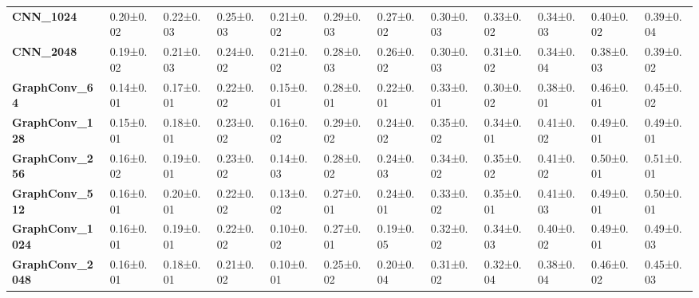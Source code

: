 \begin{tabular}{llllllllllll}
\textbf{CNN\_1024      } &   0.20±0.02 &  0.22±0.03 &  0.25±0.03 &  0.21±0.02 &  0.29±0.03 &  0.27±0.02 &  0.30±0.03 &  0.33±0.02 &  0.34±0.03 &   0.40±0.02 &   0.39±0.04 \\
\textbf{CNN\_2048      } &   0.19±0.02 &  0.21±0.03 &  0.24±0.02 &  0.21±0.02 &  0.28±0.03 &  0.26±0.02 &  0.30±0.03 &  0.31±0.02 &  0.34±0.04 &   0.38±0.03 &   0.39±0.02 \\
\textbf{GraphConv\_64  } &   0.14±0.01 &  0.17±0.01 &  0.22±0.02 &  0.15±0.01 &  0.28±0.01 &  0.22±0.01 &  0.33±0.01 &  0.30±0.02 &  0.38±0.01 &   0.46±0.01 &   0.45±0.02 \\
\textbf{GraphConv\_128 } &   0.15±0.01 &  0.18±0.01 &  0.23±0.02 &  0.16±0.02 &  0.29±0.02 &  0.24±0.02 &  0.35±0.02 &  0.34±0.01 &  0.41±0.02 &   0.49±0.01 &   0.49±0.01 \\
\textbf{GraphConv\_256 } &   0.16±0.02 &  0.19±0.01 &  0.23±0.02 &  0.14±0.03 &  0.28±0.02 &  0.24±0.03 &  0.34±0.02 &  0.35±0.02 &  0.41±0.02 &   0.50±0.01 &   0.51±0.01 \\
\textbf{GraphConv\_512 } &   0.16±0.01 &  0.20±0.01 &  0.22±0.02 &  0.13±0.02 &  0.27±0.01 &  0.24±0.01 &  0.33±0.02 &  0.35±0.01 &  0.41±0.03 &   0.49±0.01 &   0.50±0.01 \\
\textbf{GraphConv\_1024} &   0.16±0.01 &  0.19±0.01 &  0.22±0.02 &  0.10±0.02 &  0.27±0.01 &  0.19±0.05 &  0.32±0.02 &  0.34±0.03 &  0.40±0.02 &   0.49±0.01 &   0.49±0.03 \\
\textbf{GraphConv\_2048} &   0.16±0.01 &  0.18±0.01 &  0.21±0.02 &  0.10±0.01 &  0.25±0.02 &  0.20±0.04 &  0.31±0.02 &  0.32±0.04 &  0.38±0.04 &   0.46±0.02 &   0.45±0.03 \\
\bottomrule
\end{tabular}
